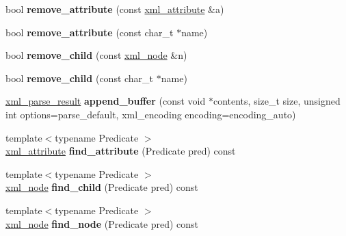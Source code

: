 \begin{DoxyCompactItemize}
\item 
\hypertarget{classpugi_1_1xml__node_aee02f0e2dab4aaeb6196f26b3bcf258c}{bool {\bfseries remove\+\_\+attribute} (const \hyperlink{classpugi_1_1xml__attribute}{xml\+\_\+attribute} \&a)}\label{classpugi_1_1xml__node_aee02f0e2dab4aaeb6196f26b3bcf258c}

\item 
\hypertarget{classpugi_1_1xml__node_a2625858b335a1289d72d19b57acc639c}{bool {\bfseries remove\+\_\+attribute} (const char\+\_\+t $\ast$name)}\label{classpugi_1_1xml__node_a2625858b335a1289d72d19b57acc639c}

\item 
\hypertarget{classpugi_1_1xml__node_a4b562d01edab7dad880e9e297203843d}{bool {\bfseries remove\+\_\+child} (const \hyperlink{classpugi_1_1xml__node}{xml\+\_\+node} \&n)}\label{classpugi_1_1xml__node_a4b562d01edab7dad880e9e297203843d}

\item 
\hypertarget{classpugi_1_1xml__node_a1930157197e41cc15eea1fc00eecf1dd}{bool {\bfseries remove\+\_\+child} (const char\+\_\+t $\ast$name)}\label{classpugi_1_1xml__node_a1930157197e41cc15eea1fc00eecf1dd}

\item 
\hypertarget{classpugi_1_1xml__node_a7e0126c503dcfba5111121ec4a94c11e}{\hyperlink{structpugi_1_1xml__parse__result}{xml\+\_\+parse\+\_\+result} {\bfseries append\+\_\+buffer} (const void $\ast$contents, size\+\_\+t size, unsigned int options=parse\+\_\+default, xml\+\_\+encoding encoding=encoding\+\_\+auto)}\label{classpugi_1_1xml__node_a7e0126c503dcfba5111121ec4a94c11e}

\item 
\hypertarget{classpugi_1_1xml__node_a4e0125eb6c0857df370119df923096ea}{{\footnotesize template$<$typename Predicate $>$ }\\\hyperlink{classpugi_1_1xml__attribute}{xml\+\_\+attribute} {\bfseries find\+\_\+attribute} (Predicate pred) const }\label{classpugi_1_1xml__node_a4e0125eb6c0857df370119df923096ea}

\item 
\hypertarget{classpugi_1_1xml__node_a25b60f2847c1937f0d4dbd4828bdcd7d}{{\footnotesize template$<$typename Predicate $>$ }\\\hyperlink{classpugi_1_1xml__node}{xml\+\_\+node} {\bfseries find\+\_\+child} (Predicate pred) const }\label{classpugi_1_1xml__node_a25b60f2847c1937f0d4dbd4828bdcd7d}

\item 
\hypertarget{classpugi_1_1xml__node_a28ccb61937080e9cefe991a0c6837be6}{{\footnotesize template$<$typename Predicate $>$ }\\\hyperlink{classpugi_1_1xml__node}{xml\+\_\+node} {\bfseries find\+\_\+node} (Predicate pred) const }\label{classpugi_1_1xml__node_a28ccb61937080e9cefe991a0c6837be6}


\end{DoxyCompactItemize}
